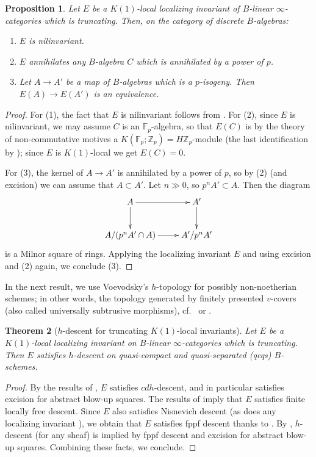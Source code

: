 \documentclass{amsart}
\newtheorem{theorem}{Theorem}[section]
\newtheorem{proposition}[theorem]{Proposition}
\theoremstyle{definition}
\begin{document}
\begin{proposition} 
\label{isogenyinv}
Let $E$ be a $K(1)$-local localizing invariant of $B$-linear
$\infty$-categories which is truncating. 
Then, on the category of discrete $B$-algebras: 
\begin{enumerate}
\item $E$ is nilinvariant. 
\item $E$ annihilates any $B$-algebra $C$   which is annihilated by a power
of $p$. 
\item Let $A \to A'$ be a map of $B$-algebras which is a $p$-isogeny. Then $E(A) \to E(A')$ is an equivalence. 
\end{enumerate}
\end{proposition} 
\begin{proof} 
For (1), the fact that $E$ is nilinvariant follows from \cite[Th.~B]{LT19}.  
For (2), 
since $E$ is nilinvariant, we may assume $C$ is an $\mathbb{F}_p$-algebra, so
that $E(C)$ is by the theory of non-commutative motives \cite{BGT13} a $K(\mathbb{F}_p; \mathbb{Z}_p)  = H\mathbb{Z}_p$-module (the
last identification by \cite{Qui72K}); since
$E$ is $K(1)$-local we get $E(C) = 0$. 

For (3),
the kernel of $A \to A'$ is annihilated by a power of $p$, so 
by (2)
(and excision) we can assume that $A \subset A'$. 
Let $n \gg 0$, so $p^n A' \subset A$. Then the diagram
\[ \xymatrix{
A \ar[d]  \ar[r] &  A' \ar[d]  \\
A/(p^n A' \cap A) \ar[r] &  A'/p^n A'
}\]
is a Milnor square of rings.  Applying the localizing invariant $E$   and using
excision and (2) again, we conclude (3).   
\end{proof} 

In the next result, we use Voevodsky's $h$-topology for
possibly non-noetherian schemes; in other words, the topology generated by finitely
presented  $v$-covers 
(also called universally subtrusive morphisms),
cf.~\cite{Rydh} or \cite[Sec.~2]{BSproj}. 

\begin{theorem}[$h$-descent for truncating $K(1)$-local invariants] 
Let $E$ be a $K(1)$-local localizing invariant on $B$-linear $\infty$-categories
which is truncating. 
Then $E$ satisfies $h$-descent on quasi-compact and quasi-separated (qcqs) $B$-schemes. 
\label{hdescthm}
\end{theorem} 
\begin{proof} 
By the results of \cite[App.~A]{LT19}, $E$ satisfies $cdh$-descent, and in
particular satisfies excision for abstract blow-up squares. 
The results of \cite{CMNN} imply that $E$ satisfies finite locally free descent. 
Since $E$ also satisfies Nisnevich descent (as does any localizing
invariant \cite{TT90}), we
obtain that $E$ satisfies fppf descent thanks to \cite[Tag
05WN]{stacks-project}. 
By \cite[Th.~2.9]{BSproj}, $h$-descent (for any sheaf) is implied by fppf descent and excision
for abstract blow-up squares. 
Combining these facts, we conclude. \end{proof} 
\end{document}
